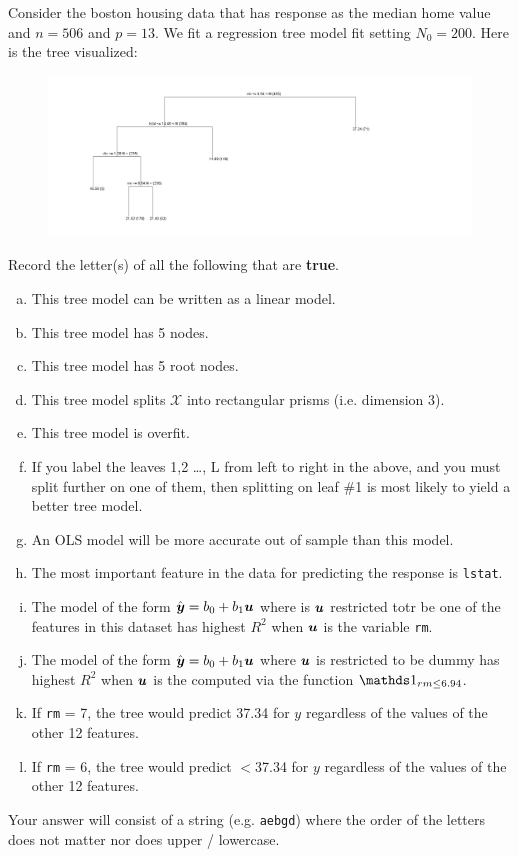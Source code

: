 \documentclass[12pt]{article}
\newcommand{\instr}{\small Your answer will consist of a string (e.g. \texttt{aebgd}) where the order of the letters does not matter nor does upper / lowercase. \normalsize}
\begin{document}

\problem [11min] Consider the boston housing data that has response as the median home value and $n = 506$ and $p = 13$. We fit a regression tree model fit setting $N_0 = 200$. Here is the tree visualized:


\begin{figure}[htp]
\centering
\includegraphics[width=9in]{yarf_mod_tree_1.png}
\end{figure}
\vspace{-1.2cm}
\benum

 Record the letter(s) of all the following that are \textbf{true}. 


\begin{enumerate}[(a)]
\item This tree model can be written as a linear model.
\item This tree model has 5 nodes.
\item This tree model has 5 root nodes.
\item This tree model splits $\mathcal{X}$ into rectangular prisms (i.e. dimension 3).
\item This tree model is overfit.
\item If you label the leaves 1,2 \ldots, L from left to right in the above, and you must split further on one of them, then splitting on leaf \#1 is most likely to yield a better tree model.
\item An OLS model will be more accurate out of sample than this model.
\item The most important feature in the data for predicting the response is \texttt{lstat}.
\item The model of the form $\hat{\boldsymbol{y}} = b_0 + b_1 \boldsymbol{u}$ where is $\boldsymbol{u}$ restricted totr be one of the features in this dataset has highest $R^2$ when $\boldsymbol{u}$ is the variable \texttt{rm}.
\item The model of the form $\hat{\boldsymbol{y}} = b_0 + b_1 \boldsymbol{u}$ where $\boldsymbol{u}$ is restricted to be dummy has highest $R^2$ when $\boldsymbol{u}$ is the computed via the function $\indic{rm \leq 6.94}$.
\item If \texttt{rm} = 7, the tree would predict 37.34 for $y$ regardless of the values of the other 12 features.
\item If \texttt{rm} = 6, the tree would predict $<$37.34 for $y$ regardless of the values of the other 12 features.
\end{enumerate}
\eenum\instr\pagebreak
\end{document}
